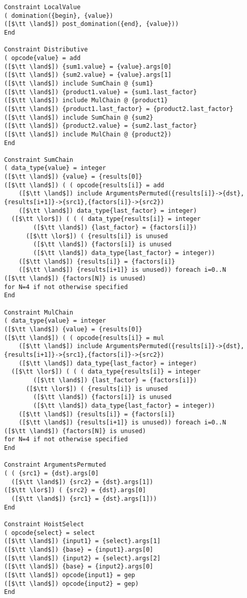 \begin{lstlisting}[language=CAnDL]
Constraint LocalValue
( domination({begin}, {value})
([$\tt \land$]) post_domination({end}, {value}))
End

Constraint Distributive
( opcode{value} = add
([$\tt \land$]) {sum1.value} = {value}.args[0]
([$\tt \land$]) {sum2.value} = {value}.args[1]
([$\tt \land$]) include SumChain @ {sum1}
([$\tt \land$]) {product1.value} = {sum1.last_factor}
([$\tt \land$]) include MulChain @ {product1}
([$\tt \land$]) {product1.last_factor} = {product2.last_factor}
([$\tt \land$]) include SumChain @ {sum2}
([$\tt \land$]) {product2.value} = {sum2.last_factor}
([$\tt \land$]) include MulChain @ {product2})
End

Constraint SumChain
( data_type{value} = integer
([$\tt \land$]) {value} = {results[0]}
([$\tt \land$]) ( ( opcode{results[i]} = add
    ([$\tt \land$]) include ArgumentsPermuted({results[i]}->{dst},{results[i+1]}->{src1},{factors[i]}->{src2})
    ([$\tt \land$]) data_type{last_factor} = integer)
  ([$\tt \lor$]) ( ( ( data_type{results[i]} = integer
        ([$\tt \land$]) {last_factor} = {factors[i]})
      ([$\tt \lor$]) ( {results[i]} is unused
        ([$\tt \land$]) {factors[i]} is unused
        ([$\tt \land$]) data_type{last_factor} = integer))
    ([$\tt \land$]) {results[i]} = {factors[i]}
    ([$\tt \land$]) {results[i+1]} is unused)) foreach i=0..N
([$\tt \land$]) {factors[N]} is unused)
for N=4 if not otherwise specified
End

Constraint MulChain
( data_type{value} = integer
([$\tt \land$]) {value} = {results[0]}
([$\tt \land$]) ( ( opcode{results[i]} = mul
    ([$\tt \land$]) include ArgumentsPermuted({results[i]}->{dst},{results[i+1]}->{src1},{factors[i]}->{src2})
    ([$\tt \land$]) data_type{last_factor} = integer)
  ([$\tt \lor$]) ( ( ( data_type{results[i]} = integer
        ([$\tt \land$]) {last_factor} = {factors[i]})
      ([$\tt \lor$]) ( {results[i]} is unused
        ([$\tt \land$]) {factors[i]} is unused
        ([$\tt \land$]) data_type{last_factor} = integer))
    ([$\tt \land$]) {results[i]} = {factors[i]}
    ([$\tt \land$]) {results[i+1]} is unused)) foreach i=0..N
([$\tt \land$]) {factors[N]} is unused)
for N=4 if not otherwise specified
End

Constraint ArgumentsPermuted
( ( {src1} = {dst}.args[0]
  ([$\tt \land$]) {src2} = {dst}.args[1])
([$\tt \lor$]) ( {src2} = {dst}.args[0]
  ([$\tt \land$]) {src1} = {dst}.args[1]))
End

Constraint HoistSelect
( opcode{select} = select
([$\tt \land$]) {input1} = {select}.args[1]
([$\tt \land$]) {base} = {input1}.args[0]
([$\tt \land$]) {input2} = {select}.args[2]
([$\tt \land$]) {base} = {input2}.args[0]
([$\tt \land$]) opcode{input1} = gep
([$\tt \land$]) opcode{input2} = gep)
End


\end{lstlisting}
